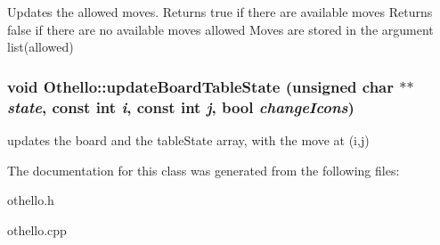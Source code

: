 \label{classOthello_a218e0649bae4dd80ed1619d01fc34e47}
Updates the allowed moves. Returns true if there are available moves Returns false if there are no available moves allowed Moves are stored in the argument list(allowed) \hypertarget{classOthello_aaabaaf21954db125526e190f9121987d}{
\subsubsection[{updateBoardTableState}]{\setlength{\rightskip}{0pt plus 5cm}void Othello::updateBoardTableState (unsigned char $\ast$$\ast$ {\em state}, \/  const int {\em i}, \/  const int {\em j}, \/  bool {\em changeIcons})}}
\label{classOthello_aaabaaf21954db125526e190f9121987d}
updates the board and the tableState array, with the move at (i,j) 

The documentation for this class was generated from the following files:\begin{DoxyCompactItemize}
\item 
othello.h\item 
othello.cpp\end{DoxyCompactItemize}
